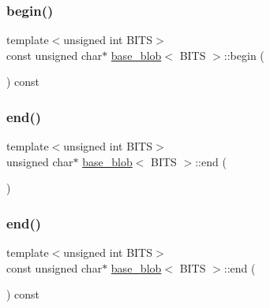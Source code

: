 \subsubsection{\texorpdfstring{begin()}{begin()}\hspace{0.1cm}{\footnotesize\ttfamily [2/2]}}
{\footnotesize\ttfamily template$<$unsigned int B\+I\+TS$>$ \\
const unsigned char$\ast$ \mbox{\hyperlink{classbase__blob}{base\+\_\+blob}}$<$ B\+I\+TS $>$\+::begin (\begin{DoxyParamCaption}{ }\end{DoxyParamCaption}) const\hspace{0.3cm}{\ttfamily [inline]}}

\mbox{\label{classbase__blob_ab60d34d18e5b5f74d285480f7b3db00c}} 
\subsubsection{\texorpdfstring{end()}{end()}\hspace{0.1cm}{\footnotesize\ttfamily [1/2]}}
{\footnotesize\ttfamily template$<$unsigned int B\+I\+TS$>$ \\
unsigned char$\ast$ \mbox{\hyperlink{classbase__blob}{base\+\_\+blob}}$<$ B\+I\+TS $>$\+::end (\begin{DoxyParamCaption}{ }\end{DoxyParamCaption})\hspace{0.3cm}{\ttfamily [inline]}}

\mbox{\label{classbase__blob_aebe1b6351e492a8f488bffda9608b8ad}} 
\subsubsection{\texorpdfstring{end()}{end()}\hspace{0.1cm}{\footnotesize\ttfamily [2/2]}}
{\footnotesize\ttfamily template$<$unsigned int B\+I\+TS$>$ \\
const unsigned char$\ast$ \mbox{\hyperlink{classbase__blob}{base\+\_\+blob}}$<$ B\+I\+TS $>$\+::end (\begin{DoxyParamCaption}{ }\end{DoxyParamCaption}) const\hspace{0.3cm}{\ttfamily [inline]}}

